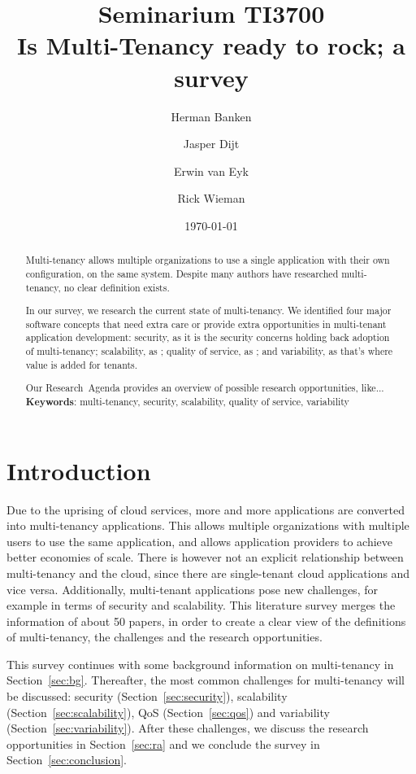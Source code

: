 \documentclass{article}
\title{Seminarium TI3700\\ Is Multi-Tenancy ready to rock; a survey}
\author{Herman Banken\and
    Jasper Dijt\and
    Erwin van Eyk\and
    Rick Wieman}
\date{\today}
\begin{document}
\maketitle
\thispagestyle{empty}

\begin{abstract}
Multi-tenancy allows multiple organizations to use a single application with their own configuration, on the same system. Despite many authors have researched multi-tenancy, no clear definition exists.

In our survey, we research the current state of multi-tenancy. We identified four major software concepts that need extra care or provide extra opportunities in multi-tenant application development: 
security, as it is the security concerns holding back adoption of multi-tenancy; %
scalability, as ; 			%
quality of service, as ; 	%
and variability, as that's where value is added for tenants.  

Our Research~Agenda provides an overview of possible research opportunities, 
like... %
\\

\textbf{Keywords}: multi-tenancy, security, scalability, quality of service, variability
\end{abstract}

\section{Introduction}
Due to the uprising of cloud services, more and more applications are converted into multi-tenancy applications. 
This allows multiple organizations with multiple users to use the same application, and allows application providers to achieve better economies of scale. 
There is however not an explicit relationship between multi-tenancy and the cloud, since there are single-tenant cloud applications and vice versa. 
Additionally, multi-tenant applications pose new challenges, for example in terms of security and scalability. 
This literature survey merges the information of about 50 papers, in order to create a clear view of the definitions of multi-tenancy, the challenges and the research opportunities.

This survey continues with some background information on multi-tenancy in Section~\ref{sec:bg}. Thereafter, the most common challenges for multi-tenancy will be discussed: security (Section~\ref{sec:security}), scalability (Section~\ref{sec:scalability}), \ac{QoS} (Section~\ref{sec:qos}) and variability (Section~\ref{sec:variability}). After these challenges, we discuss the research opportunities in Section~\ref{sec:ra} and we conclude the survey in Section~\ref{sec:conclusion}. %
\end{document}

